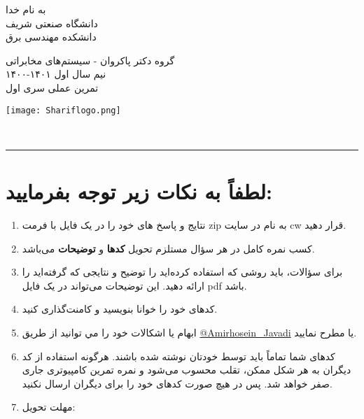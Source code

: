 \documentclass[a4paper]{article}
\begin{document}
\begin{minipage}{0.6\textwidth}
\begin{bf}
\begin{center}
	به نام خدا\\
	\vspace{0.25cm}
	دانشگاه صنعتی شریف\\
	\vspace{0.25cm}
	دانشکده مهندسی برق\\
	\vspace{0.5cm}

\large
گروه دکتر پاکروان - سیستم‌های مخابراتی \\
نیم سال اول
۱۴۰۱-۱۴۰۰\\
\Large
\vspace{0.4cm}
تمرین عملی سری اول\\
\end{center}
\end{bf}
\normalsize
\end{minipage} \hfill
\begin{minipage}{0.35\textwidth}
\begin{flushleft}
\texttt{[image: Shariflogo.png]}\\ \large
\end{flushleft}

 \end{minipage}
\\

\rule[0.1\baselineskip]{\textwidth}{1.5pt}

\large

\section*{
لطفاً به نکات زیر توجه بفرمایید:
}
\begin{enumerate}
	\item 
نتایج و پاسخ های خود را در یک فایل با فرمت zip به نام
 در سایت  cw قرار دهید.
	\item 
کسب نمره کامل در هر سؤال مستلزم تحویل  \textbf{کدها} و \textbf{توضیحات} می‌باشد. 
\item 
برای سؤالات، باید روشی که استفاده کرده‌اید را توضیح  و نتایجی که گرفته‌اید را ارائه دهید. این توضیحات می‌تواند در یک فایل  pdf باشد.
\item 
کدهای خود را خوانا بنویسید و کامنت‌‌گذاری کنید.
\item
ابهام يا اشكالات خود را مي توانيد  از طریق
\href{https://t.me/Amirhosein_javadi}{@Amirhosein\_Javadi}
یا 
\href{mailto:javadiamirhosein.2000@gmail.com}{}
مطرح نماييد.
\item 
کدهای شما تماماً باید توسط خودتان نوشته شده باشند. هرگونه استفاده از کد دیگران به هر شکل ممکن، تقلب محسوب می‌شود و نمره تمرین کامپیوتری جاری صفر خواهد شد. پس در هیچ صورت کدهای خود را برای دیگران ارسال نکنید.

\item 
مهلت تحویل:  
\end{enumerate}
\clearpage
 	
\end{document}
